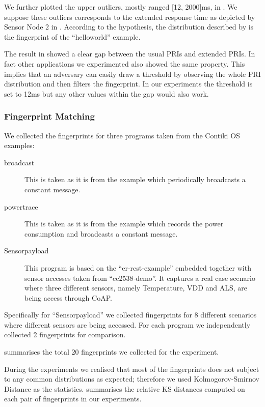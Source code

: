 We further plotted the upper outliers, mostly ranged [12, 2000]ms, in . We suppose these outliers corresponds to the extended response time as depicted by Sensor Node 2 in . According to the hypothesis, the distribution described by  is the fingerprint of the ``helloworld'' example.

The result in  showed a clear gap between the usual PRIs and extended PRIs. In fact other applications we experimented also showed the same property. This implies that an adversary can easily draw a threshold by observing the whole PRI distribution and then filters the fingerprint. In our experiments the threshold is set to 12ms but any other values within the gap would also work. 

\subsubsection{Fingerprint Matching}
We collected the fingerprints for three programs taken from the Contiki OS examples:
\begin{description}
	\item[broadcast] This is taken as it is from the example which periodically broadcasts a constant message.
	 
	\item[powertrace] This is taken as it is from the example which records the power consumption and broadcasts a constant message.
	
	\item[Sensorpayload] This program is based on the ``er-rest-example'' embedded together with sensor accesses taken from ``cc2538-demo''. It captures a real case scenario where three different sensors, namely Temperature, VDD and ALS, are being access through CoAP.
\end{description}

Specifically for ``Sensorpayload'' we collected fingerprints for 8 different scenarios where different sensors are being accessed. For each program we independently collected 2 fingerprints for comparison.

 summarises the total 20 fingerprints we collected for the experiment.

During the experiments we realised that most of the fingerprints does not subject to any common distributions as expected; therefore we used Kolmogorov-Smirnov Distance as the statistics.  summarises the relative KS distances computed on each pair of fingerprints in our experiments.

